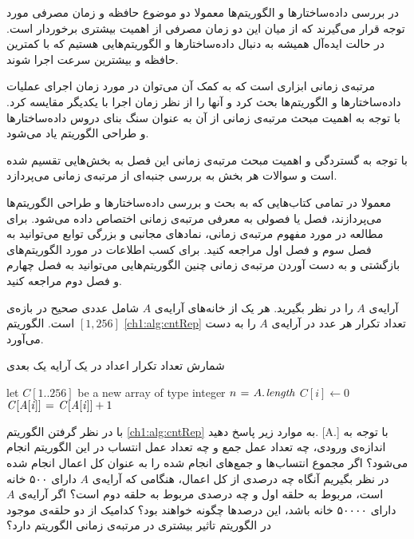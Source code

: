 در بررسی داده‌ساختارها و الگوریتم‌ها معمولا دو موضوع حافظه‌ و زمان مصرفی مورد توجه قرار می‌گیرند که از میان این دو زمان مصرفی از اهمیت بیشتری برخوردار است. در حالت ایده‌آل همیشه به دنبال داده‌ساختارها و الگوریتم‌هایی هستیم که با کمترین حافظه و بیشترین سرعت اجرا شوند.

مرتبه‌ی زمانی ابزاری است که به کمک آن می‌توان در مورد زمان اجرای عملیات داده‌ساختارها و الگوریتم‌ها بحث کرد و آنها را از نظر زمان اجرا با یکدیگر مقایسه کرد. با توجه به اهمیت مبحث مرتبه‌ی زمانی از آن به عنوان سنگ بنای دروس داده‌ساختارها و طراحی الگوریتم یاد می‌شود.

با توجه به گستردگی و اهمیت مبحث مرتبه‌ی زمانی این فصل به بخش‌هایی تقسیم شده است و سوالات هر بخش به بررسی جنبه‌ای از مرتبه‌ی زمانی می‌پردازد.

معمولا در تمامی کتاب‌هایی که به بحث و بررسی داده‌ساختارها و طراحی الگوریتم‌ها می‌پردازند، فصل یا فصولی به معرفی مرتبه‌ی زمانی اختصاص داده می‌شود. برای مطالعه در مورد مفهوم مرتبه‌ی زمانی، نمادهای مجانبی و بزرگی توابع می‌توانید به فصل سوم {\cite{clrs}} و فصل اول {\cite{ebrahimi}} مراجعه کنید. برای کسب اطلاعات در مورد الگوریتم‌های بازگشتی و به دست آوردن مرتبه‌ی زمانی چنین الگوریتم‌هایی می‌توانید به فصل چهارم {\cite{clrs}} و فصل دوم {\cite{ebrahimi}} مراجعه کنید.

 آرایه‌ی‌‌ {$A$} را در نظر بگیرید. هر یک از خانه‌ها‌ی آرایه‌ی {$A$} شامل عددی صحیح در بازه‌ی {$[1,256]$} است. الگوریتم {\eqref{ch1:alg:cntRep}} تعداد تکرار هر عدد در آرایه‌‌ی {$A$} را به دست می‌آورد.

\begin{algorithm}
\caption{شمارش تعداد تکرار اعداد در یک آرایه یک بعدی}\label{ch1:alg:cntRep}
\begin{latin}
\begin{algorithmic}[1]
	\State let $C[1..256]$ be a new array of type integer
	\State $n \mathrel{\hspace{1pt}=\hspace{1pt}} A.\hspace*{1pt}\mathit{length}$
		\State $C[i] \gets 0$
	\EndFor
			\State $\mathit{C[A[i]]} \mathrel{\hspace{1pt}=\hspace{1pt}} \mathit{C[A[i]]}+1$
	\EndFor	
\EndProcedure
\end{algorithmic}
\end{latin}
\end{algorithm}

با در نظر گرفتن الگوریتم {\eqref{ch1:alg:cntRep}} به موارد زیر پاسخ دهید.
[A.]
 با توجه به اندازه‌ی ورودی، چه تعداد عمل جمع و چه تعداد عمل انتساب در این الگوریتم انجام می‌شود؟ 
 اگر مجموع انتساب‌ها و جمع‌های انجام ‌شده را به عنوان کل اعمال انجام ‌شده در نظر بگیریم آنگاه چه درصدی از کل اعمال، هنگامی که آرایه‌ی {$A$} دارای ۵۰۰ خانه است، مربوط به حلقه اول و چه درصدی مربوط به حلقه دوم است؟ اگر آرایه‌ی {$A$} دارای ۵۰۰۰۰ خانه باشد، این درصدها چگونه خواهند بود؟
 کدامیک از دو حلقه‌ی موجود در الگوریتم تاثیر بیشتری در مرتبه‌ی زمانی الگوریتم دارد؟

